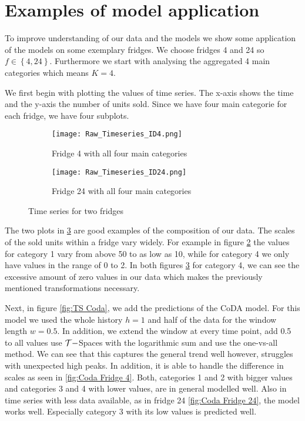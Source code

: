 \section{Examples of model application}
\label{sec:Examples of model applicatio}

To improve understanding of our data and the models we show some application of the models on some exemplary fridges. We choose fridges 4 and 24 so $f \in \left\{4,24\right\}$. Furthermore we start with analysing the aggregated 4 main categories which means $K=4$. 

We first begin with plotting the values of time series. The x-axis shows the time and the y-axis the number of units sold. Since we have four main categorie for each fridge, we have four subplots. 

\begin{figure}[htb]
\centering
\begin{subfigure}[b]{0.45\textwidth}
\texttt{[image: Raw\_Timeseries\_ID4.png]} 
\caption{Fridge 4 with all four main categories}
\label{fig:TS Fridge 4}
\end{subfigure}
\hfill
\begin{subfigure}[b]{0.45\textwidth}
\texttt{[image: Raw\_Timeseries\_ID24.png]} 
\caption{Fridge 24 with all four main categories}
\label{fig:TS Fridge 24}
\end{subfigure}
\caption{Time series for two fridges}
\label{fig:TS raw}
\end{figure}


The two plots in \ref{fig:TS raw} are good examples of the composition of our data. The scales of the sold units within a fridge vary widely. For example in figure \ref{fig:TS Fridge 24} the values for category 1 vary from above 50 to as low as 10, while for category 4 we only have values in the range of 0 to 2. In both figures \ref{fig:TS raw} for category 4, we can see the excessive amount of zero values in our data which makes the previously mentioned transformations necessary. 

Next, in figure \ref{fig:TS Coda}, we add the predictions of the CoDA model. For this model we used the whole history $h=1$ and half of the data for the window length $w=0.5$. In addition, we extend the window at every time point, add 0.5 to all values use $\mathcal{T}-$Spaces with the logarithmic sum and use the one-vs-all method. We can see that this captures the general trend well however, struggles with unexpected high peaks. In addition, it is able to handle the difference in scales as seen in \ref{fig:Coda Fridge 4}. Both, categories 1 and 2 with bigger values and categories 3 and 4 with lower values, are in general modelled well. Also in time series with less data available, as in fridge 24 \ref{fig:Coda Fridge 24}, the model works well. Especially category 3 with its low values is predicted well. 

